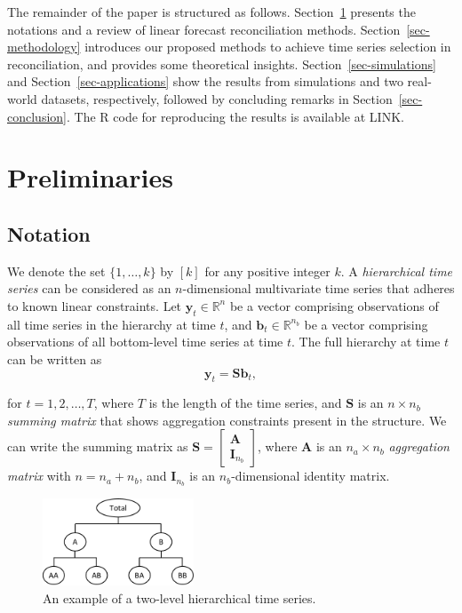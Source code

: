 \documentclass[11pt,a4paper,]{article}
\begin{document}
The remainder of the paper is structured as follows.
Section~\ref{sec-preliminaries} presents the notations and a review of
linear forecast reconciliation methods. Section~\ref{sec-methodology}
introduces our proposed methods to achieve time series selection in
reconciliation, and provides some theoretical insights.
Section~\ref{sec-simulations} and Section~\ref{sec-applications} show
the results from simulations and two real-world datasets, respectively,
followed by concluding remarks in Section~\ref{sec-conclusion}. The R
code for reproducing the results is available at LINK.

\hypertarget{sec-preliminaries}{%
\section{Preliminaries}\label{sec-preliminaries}}

\hypertarget{notation}{%
\subsection{Notation}\label{notation}}

We denote the set \(\{1,\ldots,k\}\) by \([k]\) for any positive integer
\(k\). A \emph{hierarchical time series} can be considered as an
\(n\)-dimensional multivariate time series that adheres to known linear
constraints. Let \(\boldsymbol{y}_t \in \mathbb{R}^n\) be a vector
comprising observations of all time series in the hierarchy at time
\(t\), and \(\boldsymbol{b}_t \in \mathbb{R}^{n_b}\) be a vector
comprising observations of all bottom-level time series at time \(t\).
The full hierarchy at time \(t\) can be written as \[
\boldsymbol{y}_t = \boldsymbol{S}\boldsymbol{b}_t,
\]

for \(t=1,2,\ldots,T\), where \(T\) is the length of the time series,
and \(\boldsymbol{S}\) is an \(n \times n_b\) \emph{summing matrix} that
shows aggregation constraints present in the structure. We can write the
summing matrix as
\(\boldsymbol{S} = \left[\begin{array}{c}\boldsymbol{A} \\ \boldsymbol{I}_{n_b}\end{array}\right]\),
where \(\boldsymbol{A}\) is an \(n_a \times n_b\) \emph{aggregation
matrix} with \(n = n_a + n_b\), and \(\boldsymbol{I}_{n_b}\) is an
\(n_b\)-dimensional identity matrix.

\begin{figure}

{\centering \includegraphics[width=0.4\textwidth,height=\textheight]{figs/hts_example.pdf}

}

\caption{\label{fig-hts}An example of a two-level hierarchical time
series.}

\end{figure}
\end{document}
